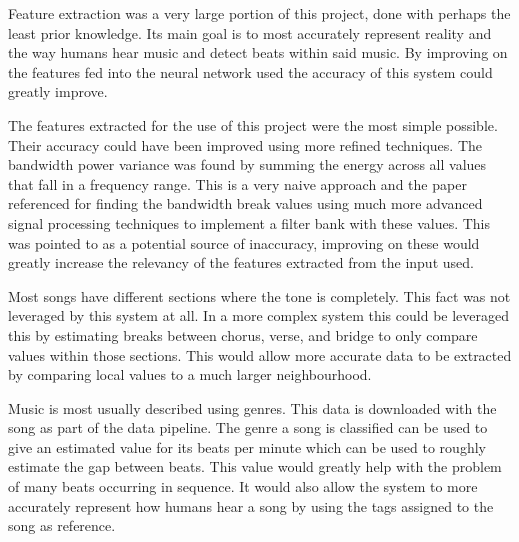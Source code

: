 Feature extraction was a very large portion of this project, done with perhaps the least prior knowledge. Its main goal is to most accurately represent reality and the way humans hear music and detect beats within said music. By improving on the features fed into the neural network used the accuracy of this system could greatly improve.

The features extracted for the use of this project were the most simple possible. Their accuracy could have been improved using more refined techniques. The bandwidth power variance was found by summing the energy across all values that fall in a frequency range. This is a very naive approach and the paper referenced for finding the bandwidth break values using much more advanced signal processing techniques to implement a filter bank with these values. This was pointed to as a potential source of inaccuracy, improving on these would greatly increase the relevancy of the features extracted from the input used.

Most songs have different sections where the tone is completely. This fact was not leveraged by this system at all. In a more complex system this could be leveraged this by estimating breaks between chorus, verse, and bridge to only compare values within those sections. This would allow more accurate data to be extracted by comparing local values to a much larger neighbourhood.

Music is most usually described using genres. This data is downloaded with the song as part of the data pipeline. The genre a song is classified can be used to give an estimated value for its beats per minute which can be used to roughly estimate the gap between beats. This value would greatly help with the problem of many beats occurring in sequence. It would also allow the system to more accurately represent how humans hear a song by using the tags assigned to the song as reference.

